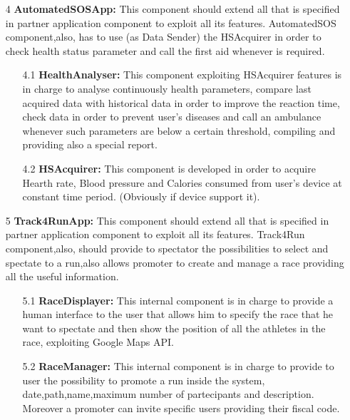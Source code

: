 \begin{enumerate}
\item [4]\textbf{AutomatedSOSApp: }
This component should extend all that is specified in partner application component to exploit all its features. AutomatedSOS component,also, has to use (as Data Sender) the HSAcquirer in order to check health status parameter and call the first aid whenever is required.

	\begin{enumerate}
	\item [4.1]\textbf{HealthAnalyser: }
	This component exploiting HSAcquirer features is in charge to analyse continuously health parameters, compare last acquired data with historical data in order to improve the reaction time, check data in order to prevent user's diseases and call an ambulance whenever such parameters are below a certain threshold, compiling and providing also a special report.
	
	\item [4.2]\textbf{HSAcquirer:}
	This component is developed in order to acquire Hearth rate, Blood pressure and Calories consumed from user's device at constant time period. (Obviously if device support it). 
	\end{enumerate}
	

\item [5]\textbf{Track4RunApp: }
This component should extend all that is specified in partner application component to exploit all its features. Track4Run component,also, should provide to spectator the possibilities to select and spectate to a run,also allows promoter to create and manage a race providing all the useful information.
	
		\begin{enumerate}
	\item [5.1]\textbf{RaceDisplayer: }
	 This internal component is in charge to provide a human interface to the user that allows him to specify the race that he want to spectate and then show the position of all the athletes in the race, exploiting Google Maps API.
	
	\item [5.2]\textbf{RaceManager: }
	This internal component is in charge to provide to user the possibility to promote a run inside the system, date,path,name,maximum number of partecipants and description. Moreover a promoter can invite specific users providing their fiscal code. 
	\end{enumerate}

\end{enumerate}

